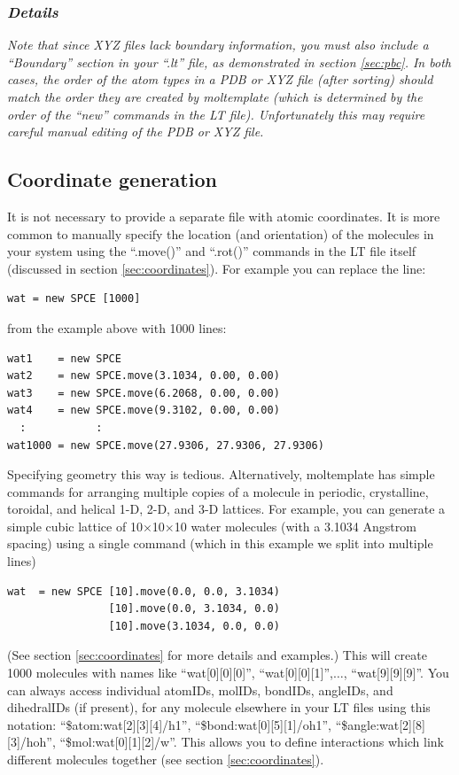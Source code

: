 \documentclass[11pt]{article}
\begin{document}
\subsubsection*{\textit{Details}}
\textit{Note that since XYZ files lack boundary information, you must also 
 include a ``Boundary'' section in your ``.lt'' file, as demonstrated 
 in section \ref{sec:pbc}. 
 In both cases, the order of the atom types in a PDB or XYZ file 
 (after sorting) should match the order they are created by moltemplate
 (which is determined by the order of the ``new'' commands 
 in the LT file). 
 Unfortunately this may require careful manual editing of the PDB or XYZ file.}

\subsection{Coordinate generation}
\label{sec:coords_intro}
It is not necessary to provide a separate file with atomic coordinates. 
It is more common to manually specify the location 
(and orientation) of the molecules in your system using the
 ``.move()'' and ``.rot()'' commands %
in the LT file itself 
(discussed in section \ref{sec:coordinates}).
For example you can replace the line:
\begin{verbatim}
wat = new SPCE [1000]
\end{verbatim}
from the example above with 1000 lines:
\begin{verbatim}
wat1    = new SPCE
wat2    = new SPCE.move(3.1034, 0.00, 0.00)
wat3    = new SPCE.move(6.2068, 0.00, 0.00)
wat4    = new SPCE.move(9.3102, 0.00, 0.00)
  :           :
wat1000 = new SPCE.move(27.9306, 27.9306, 27.9306)
\end{verbatim}
Specifying geometry this way is tedious.
Alternatively, moltemplate has simple commands for arranging multiple 
copies of a molecule in periodic, crystalline, toroidal, and helical 
1-D, 2-D, and 3-D lattices.  
For example, you can generate a simple cubic lattice of 
10$\times$10$\times$10 water molecules
(with a 3.1034 Angstrom spacing)
using a single command 
(which in this example we split into multiple lines)
\begin{verbatim}
wat  = new SPCE [10].move(0.0, 0.0, 3.1034) 
                [10].move(0.0, 3.1034, 0.0) 
                [10].move(3.1034, 0.0, 0.0)
\end{verbatim}
(See section \ref{sec:coordinates} for more details and examples.)
This will create 1000 molecules with names like
``wat[0][0][0]'', ``wat[0][0][1]'',$\ldots$, ``wat[9][9][9]''.
You can always access individual atomIDs, molIDs, bondIDs, angleIDs, 
and dihedralIDs (if present), for any molecule 
elsewhere in your LT files using this notation:
``\$atom:wat[2][3][4]/h1'', 
``\$bond:wat[0][5][1]/oh1'', 
``\$angle:wat[2][8][3]/hoh'', 
``\$mol:wat[0][1][2]/w''.
This allows you to define interactions which link
different molecules together (see section \ref{sec:coordinates}).
\end{document}
